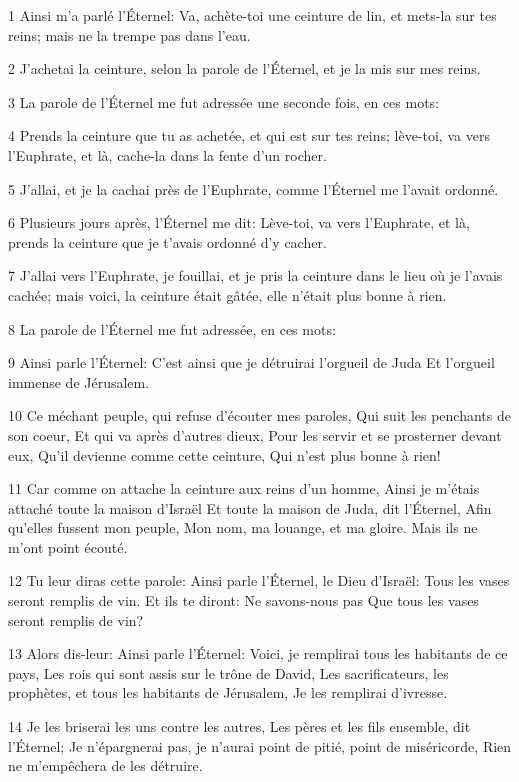 \par 1 Ainsi m'a parlé l'Éternel: Va, achète-toi une ceinture de lin, et mets-la sur tes reins; mais ne la trempe pas dans l'eau.
\par 2 J'achetai la ceinture, selon la parole de l'Éternel, et je la mis sur mes reins.
\par 3 La parole de l'Éternel me fut adressée une seconde fois, en ces mots:
\par 4 Prends la ceinture que tu as achetée, et qui est sur tes reins; lève-toi, va vers l'Euphrate, et là, cache-la dans la fente d'un rocher.
\par 5 J'allai, et je la cachai près de l'Euphrate, comme l'Éternel me l'avait ordonné.
\par 6 Plusieurs jours après, l'Éternel me dit: Lève-toi, va vers l'Euphrate, et là, prends la ceinture que je t'avais ordonné d'y cacher.
\par 7 J'allai vers l'Euphrate, je fouillai, et je pris la ceinture dans le lieu où je l'avais cachée; mais voici, la ceinture était gâtée, elle n'était plus bonne à rien.
\par 8 La parole de l'Éternel me fut adressée, en ces mots:
\par 9 Ainsi parle l'Éternel: C'est ainsi que je détruirai l'orgueil de Juda Et l'orgueil immense de Jérusalem.
\par 10 Ce méchant peuple, qui refuse d'écouter mes paroles, Qui suit les penchants de son coeur, Et qui va après d'autres dieux, Pour les servir et se prosterner devant eux, Qu'il devienne comme cette ceinture, Qui n'est plus bonne à rien!
\par 11 Car comme on attache la ceinture aux reins d'un homme, Ainsi je m'étais attaché toute la maison d'Israël Et toute la maison de Juda, dit l'Éternel, Afin qu'elles fussent mon peuple, Mon nom, ma louange, et ma gloire. Mais ils ne m'ont point écouté.
\par 12 Tu leur diras cette parole: Ainsi parle l'Éternel, le Dieu d'Israël: Tous les vases seront remplis de vin. Et ils te diront: Ne savons-nous pas Que tous les vases seront remplis de vin?
\par 13 Alors dis-leur: Ainsi parle l'Éternel: Voici, je remplirai tous les habitants de ce pays, Les rois qui sont assis sur le trône de David, Les sacrificateurs, les prophètes, et tous les habitants de Jérusalem, Je les remplirai d'ivresse.
\par 14 Je les briserai les uns contre les autres, Les pères et les fils ensemble, dit l'Éternel; Je n'épargnerai pas, je n'aurai point de pitié, point de miséricorde, Rien ne m'empêchera de les détruire.
